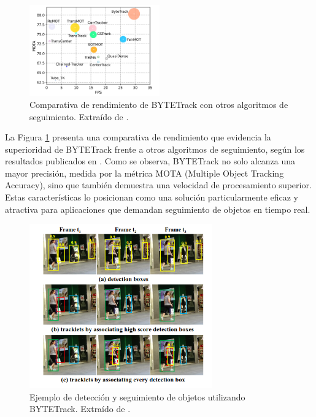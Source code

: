 \documentclass[11pt,spanish,listoffigures,listoftables]{tfgetsinf}
\begin{document}
\begin{figure}[H]
   \centering
   \includegraphics[width=0.5\textwidth]{images/estado_del_arte/BYTETrack_MOTA.png}
   \caption[Comparativa de rendimiento de BYTETrack con otros algoritmos de seguimiento]{Comparativa de rendimiento de BYTETrack con otros algoritmos de seguimiento. Extraído de \cite[fig. 1, p.~1]{zhang2022bytetrackmultiobjecttrackingassociating}.}
   \label{fig:bytetrack_mota}
\end{figure}

La Figura \ref{fig:bytetrack_mota} presenta una comparativa de rendimiento que evidencia la superioridad de BYTETrack frente a otros algoritmos de seguimiento, según los resultados publicados en \cite{zhang2022bytetrackmultiobjecttrackingassociating}. Como se observa, BYTETrack no solo alcanza una mayor precisión, medida por la métrica MOTA (Multiple Object Tracking Accuracy), sino que también demuestra una velocidad de procesamiento superior. Estas características lo posicionan como una solución particularmente eficaz y atractiva para aplicaciones que demandan seguimiento de objetos en tiempo real.

\begin{figure}[H]

   \centering
   \includegraphics[width=0.7\textwidth]{images/estado_del_arte/BYTETrack_deteccion.png}
   \caption[Ejemplo de detección y seguimiento de objetos utilizando BYTETrack]{Ejemplo de detección y seguimiento de objetos utilizando BYTETrack. Extraído de \cite[fig. 2, p.~2]{zhang2022bytetrackmultiobjecttrackingassociating}.}
   \label{fig:bytetrack_deteccion}
\end{figure}
\end{document}
